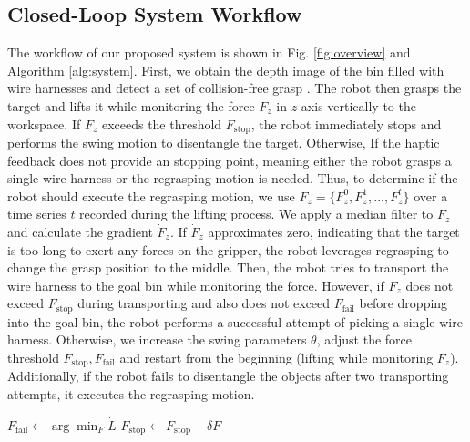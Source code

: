 \documentclass[letterpaper, 10 pt, conference]{ieeeconf}
\begin{document}
\subsection{Closed-Loop System Workflow}

    The workflow of our proposed system is shown in Fig. \ref{fig:overview} and Algorithm \ref{alg:system}. First, we obtain the depth image of the bin filled with wire harnesses and detect a set of collision-free grasp \cite{domae2014fast,zhang2022learning}. The robot then grasps the target and lifts it while monitoring the force $F_z$ in $z$ axis vertically to the workspace. If $F_z$ exceeds the threshold $F_\text{stop}$, the robot immediately stops and performs the swing motion to disentangle the target. Otherwise, If the haptic feedback does not provide an stopping point, meaning either the robot grasps a single wire harness or the regrasping motion is needed. Thus, to determine if the robot should execute the regrasping motion, we use $F_z=\{F_z^0,F_z^1,...,F_z^t\}$ over a time series $t$ recorded during the lifting process. We apply a median filter to $F_z$ and calculate the gradient $\dot{F}_z$. If $\dot{F}_z$ approximates zero, indicating that the target is too long to exert any forces on the gripper, the robot leverages regrasping to change the grasp position to the middle. Then, the robot tries to transport the wire harness to the goal bin while monitoring the force. However, if $F_z$ does not exceed $F_\text{stop}$ during transporting and also does not exceed $F_\text{fail}$ before dropping into the goal bin, the robot performs a successful attempt of picking a single wire harness. Otherwise, we increase the swing parameters $\theta$, adjust the force threshold $F_\text{stop},F_\text{fail}$ and restart from the beginning (lifting while monitoring $F_z$). Additionally, if the robot fails to disentangle the objects after two transporting attempts, it executes the regrasping motion. 
    

    

\begin{algorithm}[t]
    
    {
        {
            $F_\text{fail} \gets \arg\min_{F} \dot{L}$ \;
        }
        {
            $F_\text{stop} \leftarrow F_\text{stop} - \delta F$\;
        }
    }
\caption{Online Parameter Tuning}
\label{alg:param}
\end{algorithm}
\end{document}
